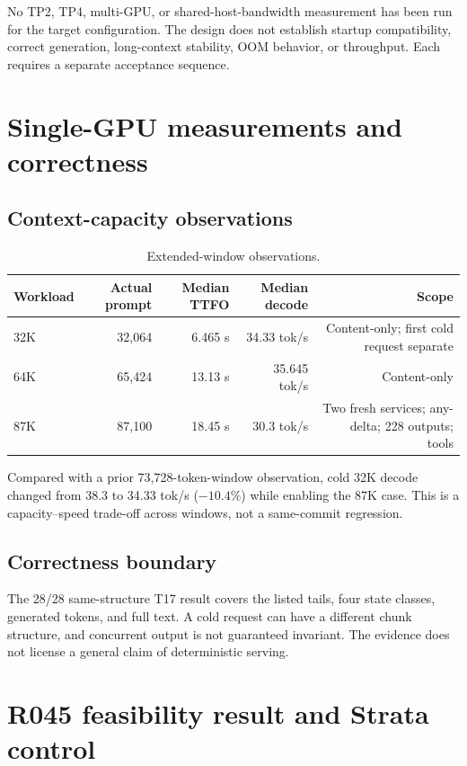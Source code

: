 \documentclass[11pt]{article}
\begin{document}
No TP2, TP4, multi-GPU, or shared-host-bandwidth measurement has been run for the target configuration. The design does not establish startup compatibility, correct generation, long-context stability, OOM behavior, or throughput. Each requires a separate acceptance sequence.

\section{Single-GPU measurements and correctness}

\subsection{Context-capacity observations}

\begin{table}[t]
\centering
\small
\begin{tabular}{lrrrr}
\toprule
Workload & Actual prompt & Median TTFO & Median decode & Scope \\
\midrule
32K & 32,064 & 6.465 s & 34.33 tok/s & Content-only; first cold request separate \\
64K & 65,424 & 13.13 s & 35.645 tok/s & Content-only \\
87K & 87,100 & 18.45 s & 30.3 tok/s & Two fresh services; any-delta; 228 outputs; tools \\
\bottomrule
\end{tabular}
\caption{Extended-window observations.}
\label{tab:capacity}
\end{table}

Compared with a prior 73,728-token-window observation, cold 32K decode changed from 38.3 to 34.33 tok/s ($-10.4\%$) while enabling the 87K case. This is a capacity--speed trade-off across windows, not a same-commit regression.

\subsection{Correctness boundary}

The 28/28 same-structure T17 result covers the listed tails, four state classes, generated tokens, and full text. A cold request can have a different chunk structure, and concurrent output is not guaranteed invariant. The evidence does not license a general claim of deterministic serving.

\section{R045 feasibility result and Strata control}
\end{document}
